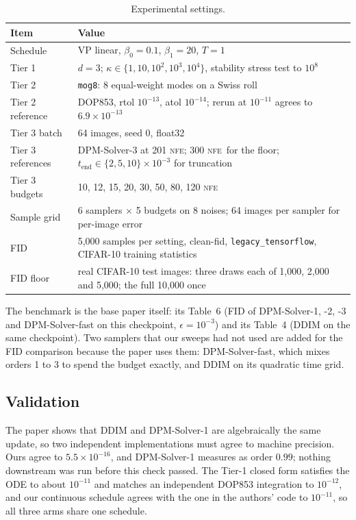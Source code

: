 \documentclass[sigconf]{acmart}
\newcommand{\NFE}{\textsc{nfe}}
\newcommand{\tend}{t_{\text{end}}}
\begin{document}
\begin{table}[t]
\caption{Experimental settings.}
\label{tab:settings}
\small
\begin{tabular}{@{}p{2.55cm}p{5.25cm}@{}}
\toprule
Item & Value \\
\midrule
Schedule & VP linear, $\beta_0=0.1$, $\beta_1=20$, $T=1$ \\
Tier 1 & $d=3$; $\kappa\in\{1,10,10^2,10^3,10^4\}$, stability stress test to $10^8$ \\
Tier 2 & \texttt{mog8}: 8 equal-weight modes on a Swiss roll \\
Tier 2 reference & DOP853, rtol $10^{-13}$, atol $10^{-14}$; rerun at $10^{-11}$ agrees to $6.9\times10^{-13}$ \\
Tier 3 batch & 64 images, seed 0, float32 \\
Tier 3 references & DPM-Solver-3 at 201 \NFE; 300 \NFE\ for the floor; $\tend\in\{2,5,10\}\times10^{-3}$ for truncation \\
Tier 3 budgets & 10, 12, 15, 20, 30, 50, 80, 120 \NFE \\
Sample grid & 6 samplers $\times$ 5 budgets on 8 noises; 64 images per sampler for per-image error \\
FID & 5{,}000 samples per setting, clean-fid, \texttt{legacy\_tensorflow}, CIFAR-10 training statistics \\
FID floor & real CIFAR-10 test images: three draws each of 1{,}000, 2{,}000 and 5{,}000; the full 10{,}000 once \\
\bottomrule
\end{tabular}
\end{table}

The benchmark is the base paper itself: its Table~6 (FID of DPM-Solver-1, -2, -3
and DPM-Solver-fast on this checkpoint, $\epsilon=10^{-3}$) and its Table~4 (DDIM
on the same checkpoint). Two samplers that our sweeps had not used are added for
the FID comparison because the paper uses them: DPM-Solver-fast, which mixes orders
1 to 3 to spend the budget exactly, and DDIM on its quadratic time grid.

\subsection{Validation}
\label{sec:validation}

The paper shows that DDIM and DPM-Solver-1 are algebraically the same update, so
two independent implementations must agree to machine precision. Ours agree to
$5.5\times10^{-16}$, and DPM-Solver-1 measures as order $0.99$; nothing downstream
was run before this check passed. The Tier-1 closed form satisfies the ODE to about
$10^{-11}$ and matches an independent DOP853 integration to $10^{-12}$, and our
continuous schedule agrees with the one in the authors' code to $10^{-11}$, so all
three arms share one schedule.
\end{document}
